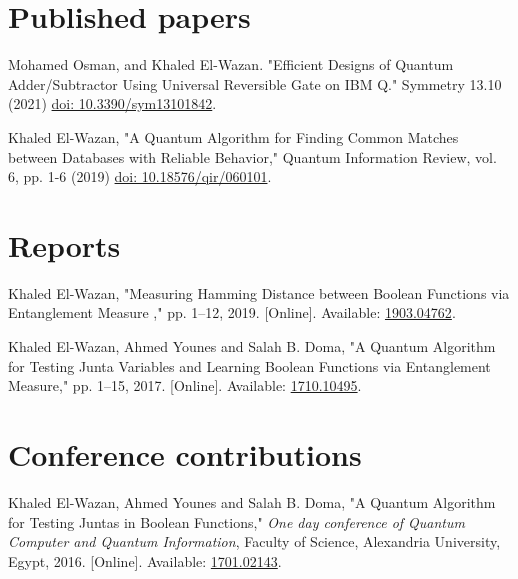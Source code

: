 \documentclass[margin,line,a4paper]{resume}
\newcommand*{\doi}[1]{\href{http://dx.doi.org/#1}{doi: #1}}
\begin{document}
\begin{resume}
    \section{ \mysidestyle Published papers}

    Mohamed Osman, and Khaled El-Wazan. "Efficient Designs of Quantum Adder/Subtractor Using Universal Reversible Gate on IBM Q." Symmetry 13.10 (2021) \doi{10.3390/sym13101842}.
    
    
    Khaled El-Wazan, "A Quantum Algorithm for Finding Common Matches between Databases with Reliable Behavior," Quantum Information Review, vol. 6, pp. 1-6 (2019) \doi{10.18576/qir/060101}.


\section{\mysidestyle Reports}

Khaled El-Wazan, "Measuring Hamming Distance between Boolean Functions via Entanglement Measure ,"  pp. 1--12, 2019. 
[Online]. Available: \href{http://arxiv.org/abs/1903.04762}{1903.04762}.



Khaled El-Wazan, Ahmed Younes and Salah B. Doma, "A Quantum Algorithm for Testing Junta Variables and Learning Boolean Functions via Entanglement Measure,"  pp. 1--15, 2017. 
[Online]. Available: \href{http://arxiv.org/abs/1710.10495}{1710.10495}.



%


\section{ \mysidestyle Conference contributions}


Khaled El-Wazan, Ahmed Younes and Salah B. Doma, "A Quantum Algorithm for Testing Juntas in Boolean Functions," \textit{One day conference of Quantum Computer and Quantum Information}, Faculty of Science, Alexandria University, Egypt, 2016. [Online]. Available: \href{http://arxiv.org/abs/1701.02143}{1701.02143}.


\end{resume}
\end{document}
